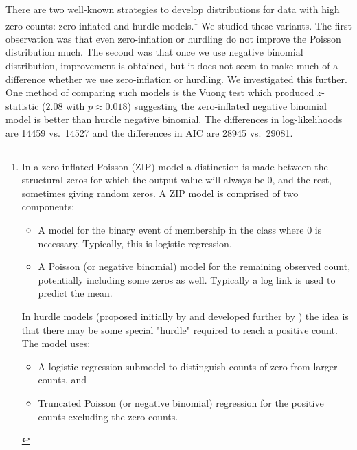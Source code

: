 \documentclass[a4paper,fleqn]{cas-dc}
\begin{document}
There are two well-known strategies to develop distributions for data
with high zero counts: zero-inflated and hurdle
models.\footnote{In a zero-inflated Poisson (ZIP) model \citep{Lambert1992Zero} a distinction is made between   the structural zeros for which the output value  will always be 0, and the rest, sometimes giving random zeros. A  ZIP model is comprised of two components:

\begin{itemize}
\item  A model for the binary event of membership in the class where 0 is necessary. Typically, this is logistic regression. 

\item  A Poisson (or negative binomial) model for the remaining observed count, potentially including some zeros as well. Typically a log link is used to predict the mean.
\end{itemize}


In hurdle models (proposed initially by \citet{Cragg1971Some} and developed further by \citet{Mullahy1986}) the idea  is that there may be some special  "hurdle" required to reach a positive count. The model  uses:

\begin{itemize}
\item A logistic regression  submodel to distinguish counts of zero from larger counts, and
\item  Truncated Poisson (or negative binomial) regression for the positive counts  excluding the zero counts.
\end{itemize}} We studied these variants. The first observation was that
even zero-inflation or hurdling do not improve the Poisson distribution
much. The second was that once we use negative binomial distribution,
improvement is obtained, but it does not seem to make much of a
difference whether we use zero-inflation or hurdling. We investigated
this further. One method of comparing such models is the Vuong test
which produced \(z\)-statistic (\(2.08\) with \(p\approx 0.018\))
suggesting the zero-inflated negative binomial model is better than
hurdle negative binomial. The differences in log-likelihoods are 
14459 vs.~14527 and the differences in  AIC are 28945 vs.~29081.
\end{document}

